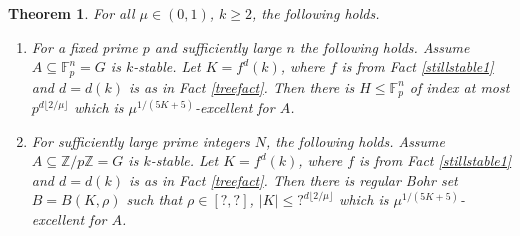 \documentclass[11pt]{article}
\newtheorem{theorem}{Theorem}
\theoremstyle{definition}
\begin{document}
\begin{theorem}\label{mainth}
For all $\mu\in (0,1)$,  $k\geq 2$, the following holds. 
\begin{enumerate}
\item For a fixed prime $p$ and sufficiently large $n$ the following holds.  Assume $A\subseteq \mathbb{F}^n_p=G$ is $k$-stable.  Let $K=f^d(k)$, where $f$ is from Fact \ref{stillstable1} and $d=d(k)$ is as in Fact \ref{treefact}. Then there is $H\leq \mathbb{F}_p^n$ of index at most $p^{d\lfloor 2/\mu \rfloor}$ which is $\mu^{1/(5K+5)}$-excellent for $A$.
\item For sufficiently large prime integers $N$, the following holds.  Assume $A\subseteq \mathbb{Z}/p\mathbb{Z}=G$ is $k$-stable.  Let $K=f^d(k)$, where $f$ is from Fact \ref{stillstable1} and $d=d(k)$ is as in Fact \ref{treefact}. Then there is regular Bohr set $B=B(K,\rho)$ such that $\rho \in [?,?]$, $|K|\leq ?^{d\lfloor 2/\mu \rfloor}$ which is $\mu^{1/(5K+5)}$-excellent for $A$.
\end{enumerate}
\end{theorem}
\end{document}
